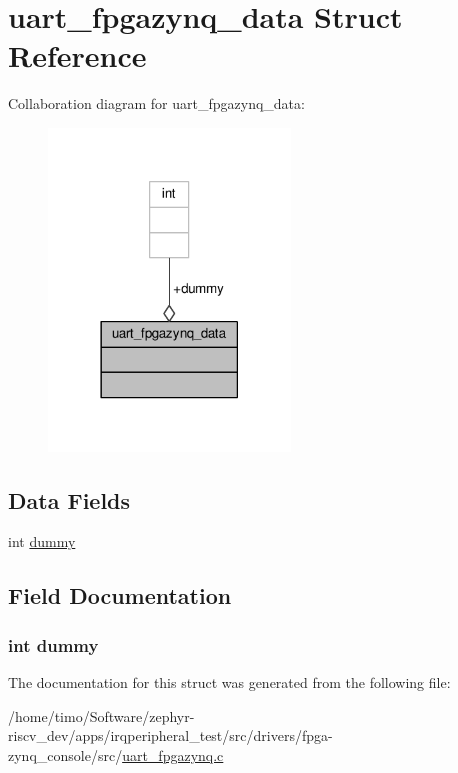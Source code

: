 \hypertarget{structuart__fpgazynq__data}{}\section{uart\+\_\+fpgazynq\+\_\+data Struct Reference}
\label{structuart__fpgazynq__data}


Collaboration diagram for uart\+\_\+fpgazynq\+\_\+data\+:\nopagebreak
\begin{figure}[H]
\begin{center}
\leavevmode
\includegraphics[width=182pt]{structuart__fpgazynq__data__coll__graph}
\end{center}
\end{figure}
\subsection*{Data Fields}
\begin{DoxyCompactItemize}
\item 
int \hyperlink{structuart__fpgazynq__data_a7c1d654b7b6114d7a0abc8d351dd1bcd}{dummy}
\end{DoxyCompactItemize}


\subsection{Field Documentation}
\subsubsection[{\texorpdfstring{dummy}{dummy}}]{\setlength{\rightskip}{0pt plus 5cm}int dummy}\hypertarget{structuart__fpgazynq__data_a7c1d654b7b6114d7a0abc8d351dd1bcd}{}\label{structuart__fpgazynq__data_a7c1d654b7b6114d7a0abc8d351dd1bcd}


The documentation for this struct was generated from the following file\+:\begin{DoxyCompactItemize}
\item 
/home/timo/\+Software/zephyr-\/riscv\+\_\+dev/apps/irqperipheral\+\_\+test/src/drivers/fpga-\/zynq\+\_\+console/src/\hyperlink{uart__fpgazynq_8c}{uart\+\_\+fpgazynq.\+c}\end{DoxyCompactItemize}
